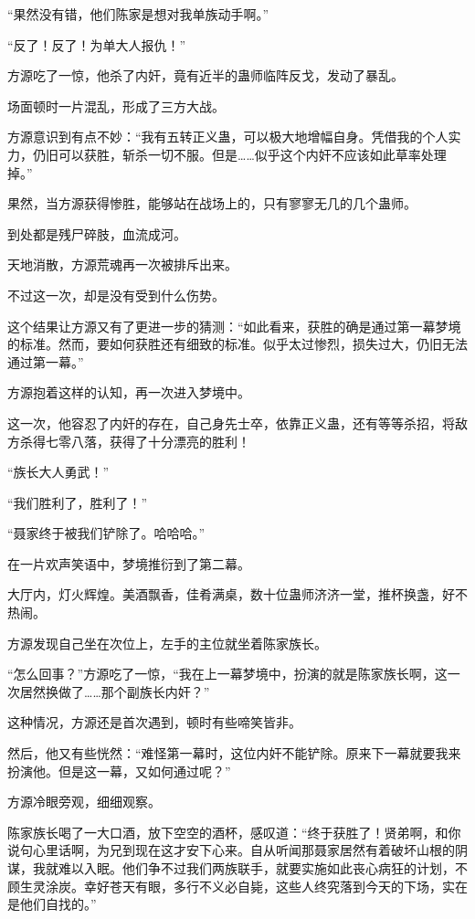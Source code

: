 \begin{this_body}
“果然没有错，他们陈家是想对我单族动手啊。”

“反了！反了！为单大人报仇！”

方源吃了一惊，他杀了内奸，竟有近半的蛊师临阵反戈，发动了暴乱。

场面顿时一片混乱，形成了三方大战。

方源意识到有点不妙：“我有五转正义蛊，可以极大地增幅自身。凭借我的个人实力，仍旧可以获胜，斩杀一切不服。但是……似乎这个内奸不应该如此草率处理掉。”

果然，当方源获得惨胜，能够站在战场上的，只有寥寥无几的几个蛊师。

到处都是残尸碎肢，血流成河。

天地消散，方源荒魂再一次被排斥出来。

不过这一次，却是没有受到什么伤势。

这个结果让方源又有了更进一步的猜测：“如此看来，获胜的确是通过第一幕梦境的标准。然而，要如何获胜还有细致的标准。似乎太过惨烈，损失过大，仍旧无法通过第一幕。”

方源抱着这样的认知，再一次进入梦境中。

这一次，他容忍了内奸的存在，自己身先士卒，依靠正义蛊，还有等等杀招，将敌方杀得七零八落，获得了十分漂亮的胜利！

“族长大人勇武！”

“我们胜利了，胜利了！”

“聂家终于被我们铲除了。哈哈哈。”

在一片欢声笑语中，梦境推衍到了第二幕。

大厅内，灯火辉煌。美酒飘香，佳肴满桌，数十位蛊师济济一堂，推杯换盏，好不热闹。

方源发现自己坐在次位上，左手的主位就坐着陈家族长。

“怎么回事？”方源吃了一惊，“我在上一幕梦境中，扮演的就是陈家族长啊，这一次居然换做了……那个副族长内奸？”

这种情况，方源还是首次遇到，顿时有些啼笑皆非。

然后，他又有些恍然：“难怪第一幕时，这位内奸不能铲除。原来下一幕就要我来扮演他。但是这一幕，又如何通过呢？”

方源冷眼旁观，细细观察。

陈家族长喝了一大口酒，放下空空的酒杯，感叹道：“终于获胜了！贤弟啊，和你说句心里话啊，为兄到现在这才安下心来。自从听闻那聂家居然有着破坏山根的阴谋，我就难以入眠。他们争不过我们两族联手，就要实施如此丧心病狂的计划，不顾生灵涂炭。幸好苍天有眼，多行不义必自毙，这些人终究落到今天的下场，实在是他们自找的。”


\end{this_body}
